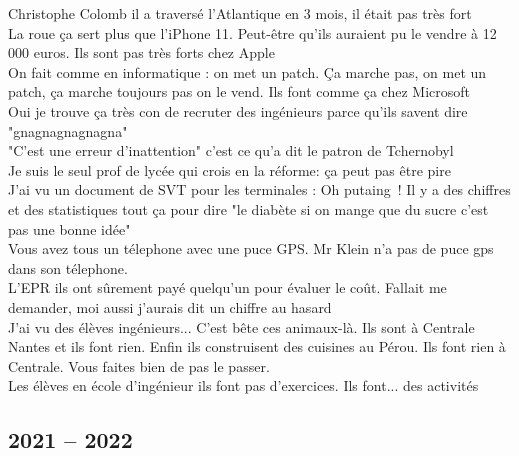 \documentclass[french, a4paper, openany]{book}
\begin{document}
	\noindent \og Christophe Colomb il a traversé l'Atlantique en 3 mois, il était pas très fort \fg \\
	\og La roue ça sert plus que l'iPhone 11. Peut-être qu'ils auraient pu le vendre à 12 000 euros. Ils sont pas très forts chez Apple \fg \\
	\og On fait comme en informatique : on met un patch. Ça marche pas, on met un patch, ça marche toujours pas on le vend. Ils font comme ça chez Microsoft \fg \\
	\og Oui je trouve ça très con de recruter des ingénieurs parce qu'ils savent dire "gnagnagnagnagna" \fg \\
	\og "C'est une erreur d'inattention" c'est ce qu'a dit le patron de Tchernobyl \fg \\
	\og Je suis le seul prof de lycée qui crois en la réforme: ça peut pas être pire \fg \\
	\og J'ai vu un document de SVT pour les terminales : Oh putaing~! Il y a des chiffres et des statistiques tout ça pour dire "le diabète si on mange que du sucre c'est pas une bonne idée" \fg \\
	\og Vous avez tous un télephone avec une puce GPS. Mr Klein n'a pas de puce gps dans son télephone. \fg \\
	\og L'EPR ils ont sûrement payé quelqu'un pour évaluer le coût. Fallait me demander, moi aussi j'aurais dit un chiffre au hasard \fg \\
	\og J'ai vu des élèves ingénieurs... C'est bête ces animaux-là. Ils sont à Centrale Nantes et ils font rien. Enfin ils construisent des cuisines au Pérou. Ils font rien à Centrale. Vous faites bien de pas le passer. \fg \\
	\og Les élèves en école d'ingénieur ils font pas d'exercices. Ils font... des activités \fg \\

	\subsection*{2021 -- 2022}
\end{document}
